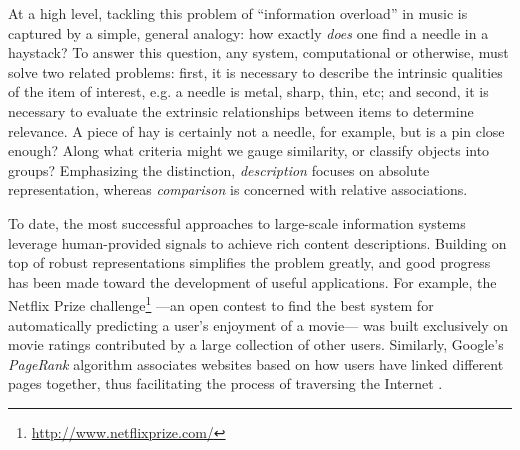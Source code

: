 At a high level, tackling this problem of ``information overload'' in music is captured by a simple, general analogy: how exactly \emph{does} one find a needle in a haystack?
To answer this question, any system, computational or otherwise, must solve two related problems:
first, it is necessary to describe the intrinsic qualities of the item of interest, e.g. a needle is metal, sharp, thin, etc;
and second, it is necessary to evaluate the extrinsic relationships between items to determine relevance.
A piece of hay is certainly not a needle, for example, but is a pin close enough?
Along what criteria might we gauge similarity, or classify objects into groups?
Emphasizing the distinction, \emph{description} focuses on absolute representation, whereas \emph{comparison} is concerned with relative associations.

To date, the most successful approaches to large-scale information systems leverage human-provided signals to achieve rich content descriptions.
Building on top of robust representations simplifies the problem greatly, and good progress has been made toward the development of useful applications.
For example, the Netflix Prize challenge\footnote{\url{http://www.netflixprize.com/}} ---an open contest to find the best system for automatically predicting a user's enjoyment of a movie--- was built exclusively on movie ratings contributed by a large collection of other users.
Similarly, Google's \emph{PageRank} algorithm associates websites based on how users have linked different pages together, thus facilitating the process of traversing the Internet \cite{Page1999Pagerank}.

